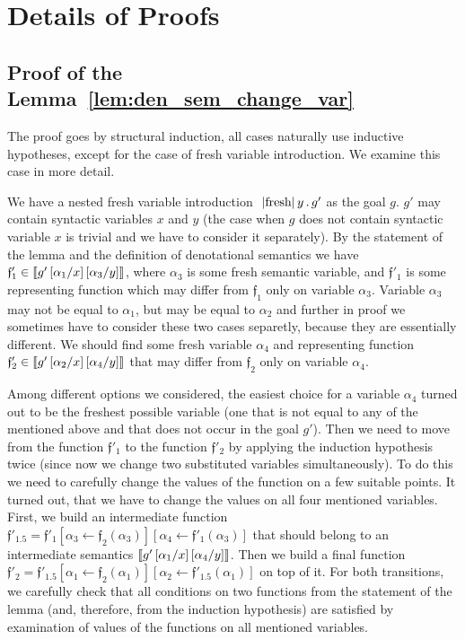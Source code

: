 \clearpage

\section{Details of Proofs}
\label{appendix_proofs}

\subsection{Proof of the Lemma~\ref{lem:den_sem_change_var}}
\label{appendix_den_sem_change_var_proof}

The proof goes by structural induction, all cases naturally use inductive hypotheses, except for the case of fresh variable introduction. We examine this case in more detail.

We have a nested fresh variable introduction $\mbox{\lstinline|fresh|}\,y\,.\,g'$ as the goal $g$. $g'$ may contain syntactic variables $x$ and $y$ (the case when $g$ does not contain syntactic variable $x$ is trivial and we have to consider it separately). By the statement of the lemma and the definition of denotational semantics we have ${\mathfrak f'_1} \in \llbracket{g'\,[\alpha_1/x]\,[\alpha_3/y]}\rrbracket$, where $\alpha_3$ is some fresh semantic variable, and ${\mathfrak f'_1}$ is some representing function which may differ from ${\mathfrak f_1}$ only on variable $\alpha_3$. Variable $\alpha_3$ may not be equal to $\alpha_1$, but may be equal to $\alpha_2$ and further in proof we sometimes have to consider these two cases separetly, because they are essentially different. We should find some fresh variable $\alpha_4$ and representing function ${\mathfrak f'_2} \in \llbracket{g'\,[\alpha_2/x]\,[\alpha_4/y]}\rrbracket$ that may differ from ${\mathfrak f_2}$ only on variable $\alpha_4$.

Among different options we considered, the easiest choice for a variable $\alpha_4$ turned out to be the freshest possible variable (one that is not equal to any of the mentioned above and that does not occur in the goal $g'$). Then we need to move from the function ${\mathfrak f'_1}$ to the function ${\mathfrak f'_2}$ by applying the induction hypothesis twice (since now we change two substituted variables simultaneously). To do this we need to carefully change the values of the function on a few suitable points. It turned out, that we have to change the values on all four mentioned variables. First, we build an intermediate function ${\mathfrak f'_{1.5}} = {\mathfrak f'_1}[\alpha_3\gets {\mathfrak f_2}(\alpha_3)][\alpha_4\gets {\mathfrak f'_1}(\alpha_3)]$ that should belong to an intermediate semantics $\llbracket{g'\,[\alpha_1/x]\,[\alpha_4/y]}\rrbracket$. Then we build a final function ${\mathfrak f'_2} = {\mathfrak f'_{1.5}}[\alpha_1\gets {\mathfrak f_2}(\alpha_1)][\alpha_2\gets {\mathfrak f'_{1.5}}(\alpha_1)]$ on top of it. For both transitions, we carefully check that all conditions on two functions from the statement of the lemma (and, therefore, from the induction hypothesis) are satisfied by examination of values of the functions on all mentioned variables.

